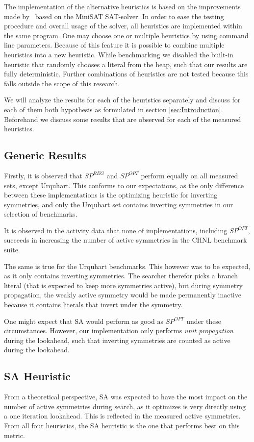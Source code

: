 The implementation of the alternative heuristics is based on the improvements
made by~\cite{devriendt2012symmetry} based on the MiniSAT SAT-solver.
In order to ease the testing procedure and overall usage of the solver, all heuristics
are implemented within the same program. One may choose one or multiple heuristics
by using command line parameters. Because of this feature it is possible to combine
multiple heuristics into a new heuristic.
While benchmarking we disabled the built-in heuristic that randomly chooses a literal from the heap,
such that our results are fully deterministic.
Further combinations of heuristics are not tested because this falls outside the scope
of this research.

We will analyze the results for each of the heuristics separately and discuss for each of them both
hypothesis as formulated in section \ref{sec:Introduction}.
Beforehand we discuss some results that are observed for each of the measured heuristics.

\subsection{Generic Results}
	Firstly, it is observed that $SP^{REG}$ and $SP^{OPT}$ perform equally on all measured sets,
	except Urquhart.
	This conforms to our expectations, as the only difference between these implementations is the
	optimizing heuristic for inverting symmetries, and only the Urquhart set contains inverting
	symmetries in our selection of benchmarks.

	It is observed in the activity data that none of implementations, including $SP^{OPT}$,
	succeeds in increasing the number of active symmetries in the CHNL benchmark suite.

	The same is true for the Urquhart benchmarks.
	This however was to be expected, as it only contains inverting symmetries.
	The searcher therefor picks a branch literal (that is expected to keep more symmetries active),
	but during symmetry propagation, the weakly active symmetry would be made permanently inactive
	because it contains literals that invert under the symmetry.

	One might expect that SA would perform as good as $SP^{OPT}$ under these circumstances.
	However, our implementation only performs \emph{unit propagation} during the lookahead, such
	that inverting symmetries are counted as active during the lookahead.

\subsection{SA Heuristic}
	From a theoretical perspective, SA was expected to have the most impact on the number of active
	symmetries during search, as it optimizes is very directly using a one iteration lookahead.
	This is reflected in the measured active symmetries.
	From all four heuristics, the SA heuristic is the one that performs best on this metric.

